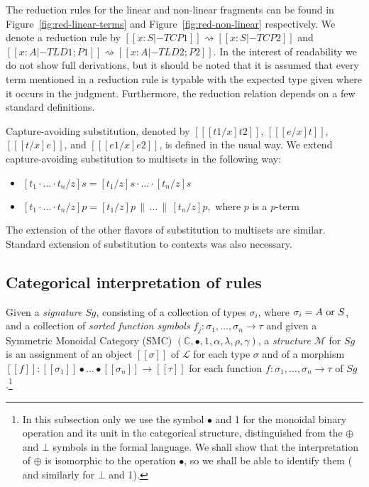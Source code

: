 The reduction rules for the linear and non-linear fragments can be
found in Figure~\ref{fig:red-linear-terms} and
Figure~\ref{fig:red-non-linear} respectively.  We denote a reduction
rule by $[[x : S |-TC P1]] \rightsquigarrow [[x : S |-TC P2]]$ and
$[[x : A |-TL D1;P1]] \rightsquigarrow [[x : A |-TL D2;P2]]$.  In the
interest of readability we do not show full derivations, but it should
be noted that it is assumed that every term mentioned in a reduction
rule is typable with the expected type given where it occurs in the
judgment.  Furthermore, the reduction relation depends on a few
standard definitions.

Capture-avoiding substitution, denoted by $[[ [t1/x]t2]]$, $[[
    [e/x]t]]$, $[[ [t/x]e]]$, and $[[ [e1/x]e2]]$, is defined in the
usual way.  We extend capture-avoiding substitution to multisets in
the following way:
\begin{itemize}
\item $[t_1\cdot\ldots\cdot t_n/ z]s = [t_1/z]s\cdot\ldots\cdot [t_n/ z]s$
\item $[t_1\cdot\ldots\cdot t_n/ z]p = [t_1/z]p\,\|\, \ldots\,\|\, [t_n/ z]p,$ where $p$ is a $p$-term
\end{itemize}
The extension of the other flavors of substitution to multisets are
similar.  Standard extension of substitution to contexts was also
necessary.

\subsection{Categorical interpretation of rules}
\label{sec:categorical_interpretation_of_rules}

\noindent
Given a {\em signature} $Sg$, consisting of a collection of types $\sigma_i$, where $\sigma_i = A\ \hbox{or}\ S$, 
and a collection of {\em sorted function symbols} $f_j : \sigma_1, \ldots, \sigma_n \rightarrow \tau$ and given 
a Symmetric Monoidal Category (SMC) $(\mathbb{C}, \bullet, 1, \alpha, \lambda, \rho, \gamma)$,  a {\em structure} 
$\mathcal{M}$ for $Sg$ is an assignment of an object $[\![\sigma]\!]$ of $\mathcal{L}$ for each type $\sigma$ and of 
a morphism $[\![f]\!] : [\![\sigma_1]\!]\bullet\ldots\bullet[\![\sigma_n]\!]\rightarrow [\![\tau]\!]$ for each function $f : \sigma_1, \ldots, \sigma_n \rightarrow \tau$ of $Sg$.\footnote{ In this subsection only we use the symbol $\bullet$ and 1 for the monoidal binary operation and its unit in the categorical structure, distinguished from the $\oplus$ and $\bot$ symbols 
in the formal language. We shall show that the interpretation of $\oplus$ is isomorphic to the operation $\bullet$, 
so we shall be able to identify them ( and similarly for $\bot$ and 1).}

